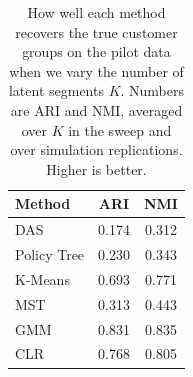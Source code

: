 \begin{table}[htbp]
\centering
\caption{How well each method recovers the true customer groups on the pilot data when we vary the number of latent segments $K$. Numbers are ARI and NMI, averaged over $K$ in the sweep and over simulation replications. Higher is better.}
\label{tab:app-ari-nmi-varying-K-avg}
\begin{tabular}{lcc}
\toprule
Method & ARI & NMI \\
\midrule
DAS & 0.174 & 0.312 \\
Policy Tree & 0.230 & 0.343 \\
K-Means & 0.693 & 0.771 \\
MST & 0.313 & 0.443 \\
GMM & 0.831 & 0.835 \\
CLR & 0.768 & 0.805 \\
\bottomrule
\end{tabular}
\end{table}
